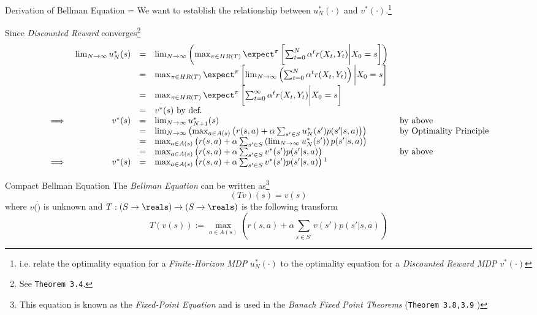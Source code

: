 \documentclass[11pt,a4paper]{article}
\begin{document}
  \begin{proposition}{Derivation of Bellman Equation}
    \everymath={\displaystyle}
    We want to establish the relationship between $u_N^*(\cdot)$ and $v^*(\cdot)$.\footnote{i.e. relate the optimality equation for a \textit{Finite-Horizon MDP} $u_N^*(\cdot)$ to the optimality equation for a \textit{Discounted Reward MDP} $v^*(\cdot)$}
    \par Since \textit{Discounted Reward} converges\footnote{See \texttt{Theorem 3.4}.}
    \[\begin{array}{rrcll}
      &\lim_{N\to\infty}u_N^*(s)&=&\lim_{N\to\infty}\left(\max_{\pi\in HR(T)}\expect^\pi\left[\sum_{t=0}^N\alpha^tr(X_t,Y_t)\bigg|X_0=s\right]\right)\\
      &&=&\max_{\pi\in HR(T)}\expect^\pi\left[\lim_{N\to\infty}\left(\sum_{t=0}^N\alpha^tr(X_t,Y_t)\right)\bigg|X_0=s\right]\\
      &&=&\max_{\pi\in HR(T)}\expect^\pi\left[\sum_{t=0}^\infty\alpha^tr(X_t,Y_t)\bigg|X_0=s\right]\\
      &&=&v^*(s)\text{ by def.}\\
      \implies&v^*(s)&=&\lim_{N\to\infty}u_{N+1}^*(s)&\text{ by above}\\
      &&=&\lim_{N\to\infty}\left(\max_{a\in A(s)}\left(r(s,a)+\alpha\sum_{s'\in S}u_N^*(s')p(s'|s,a)\right)\right)&\text{ by Optimality Principle}\\
      &&=&\max_{a\in A(s)}\left(r(s,a)+\alpha\sum_{s'\in S}\left(\lim_{N\to\infty}u_N^*(s')\right)p(s'|s,a)\right)\\
      &&=&\max_{a\in A(s)}\left(r(s,a)+\alpha\sum_{s'\in S}v^*(s')p(s'|s,a)\right)&\text{ by above}\\
      \implies&v^*(s)&=&\max_{a\in A(s)}\left(r(s,a)+\alpha\sum_{s'\in S}v^*(s')p(s'|s,a)\right)\footnotemark
    \end{array}\]
  \end{proposition}

  \begin{remark}{Compact Bellman Equation}
    The \textit{Bellman Equation} can be written as\footnote{This equation is known as the \textit{Fixed-Point Equation} and is used in the \textit{Banach Fixed Point Theorems} (\texttt{Theorem 3.8,3.9} )}
    \[ (Tv)(s)=v(s) \]
    where $v(\dot)$ is unknown and $T:(S\to\reals)\to(S\to\reals)$ is the following transform
    \[ T(v(s)):=\max_{a\in A(s)}\left(r(s,a)+\alpha\sum_{s\in S'}v(s')p(s'|s,a)\right) \]
  \end{remark}
\end{document}
